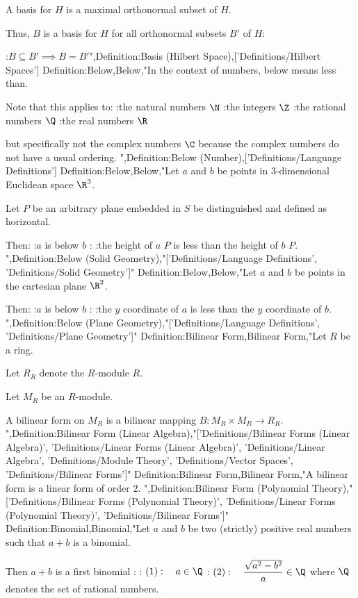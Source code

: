 A basis for $H$ is a maximal orthonormal subset of $H$.

Thus, $B$ is a basis for $H$  for all orthonormal subsets $B'$ of $H$:

:$B \subseteq B' \implies B = B'$",Definition:Basis (Hilbert Space),['Definitions/Hilbert Spaces']
Definition:Below,Below,"In the context of numbers, below means less than.

Note that this applies to:
:the natural numbers $\N$
:the integers $\Z$
:the rational numbers $\Q$
:the real numbers $\R$

but specifically not the complex numbers $\C$ because the complex numbers do not have a usual ordering.
",Definition:Below (Number),['Definitions/Language Definitions']
Definition:Below,Below,"Let $a$ and $b$ be points in $3$-dimensional Euclidean space $\R^3$.

Let $P$ be an arbitrary plane embedded in $S$ be distinguished and defined as horizontal.

Then:
:$a$ is below $b$
:
:the height of $a$  $P$ is less than the height of $b$  $P$.
",Definition:Below (Solid Geometry),"['Definitions/Language Definitions', 'Definitions/Solid Geometry']"
Definition:Below,Below,"Let $a$ and $b$ be points in the cartesian plane $\R^2$.

Then:
:$a$ is below $b$
:
:the $y$ coordinate of $a$ is less than the $y$ coordinate of $b$.
",Definition:Below (Plane Geometry),"['Definitions/Language Definitions', 'Definitions/Plane Geometry']"
Definition:Bilinear Form,Bilinear Form,"Let $R$ be a ring.

Let $R_R$ denote the $R$-module $R$.

Let $M_R$ be an $R$-module.


A bilinear form on $M_R$ is a bilinear mapping $B : M_R \times M_R \to R_R$.
",Definition:Bilinear Form (Linear Algebra),"['Definitions/Bilinear Forms (Linear Algebra)', 'Definitions/Linear Forms (Linear Algebra)', 'Definitions/Linear Algebra', 'Definitions/Module Theory', 'Definitions/Vector Spaces', 'Definitions/Bilinear Forms']"
Definition:Bilinear Form,Bilinear Form,"A bilinear form is a linear form of order $2$.
",Definition:Bilinear Form (Polynomial Theory),"['Definitions/Bilinear Forms (Polynomial Theory)', 'Definitions/Linear Forms (Polynomial Theory)', 'Definitions/Bilinear Forms']"
Definition:Binomial,Binomial,"Let $a$ and $b$ be two (strictly) positive real numbers such that $a + b$ is a binomial.


Then $a + b$ is a first binomial :
: $(1): \quad a \in \Q$
: $(2): \quad \dfrac {\sqrt {a^2 - b^2} } a \in \Q$
where $\Q$ denotes the set of rational numbers.



